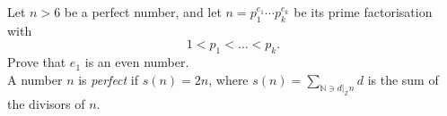 \begin{problem}
    Let \( n > 6 \) be a perfect number, and let \( n = p_{1}^{e_{1}} \cdots p_{k}^{e_{k}} \) be its
    prime factorisation with \[1 < p_{1} < \ldots < p_{k}.\] Prove that \( e_{1} \) is an even
    number. \\
    A number \( n \) is \textit{perfect} if \( s\left(n\right) = 2n \), where \( s\left(n\right)=\sum_{\mathbb{N}\ni d|_{\mathbb{Z}}n}d \) is the sum of the divisors of \( n \).
\end{problem}
